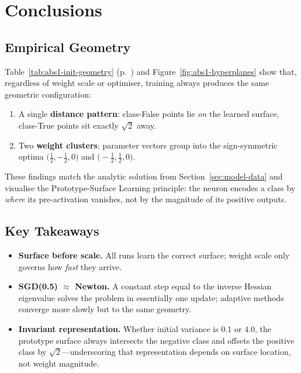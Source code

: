 ﻿%
\section{Conclusions}
\label{sec:abs1-conclusions}

\subsection*{Empirical Geometry}

Table~\ref{tab:abs1-init-geometry} (p.~\pageref{tab:abs1-init-geometry}) and
Figure~\ref{fig:abs1-hyperplanes} show that, regardless of weight scale or
optimiser, training always produces the same geometric configuration:

\begin{enumerate}[label=(\alph*)]
    \item A single \textbf{distance pattern}: class-False points lie \emph{on}
          the learned surface, class-True points sit exactly
          $\sqrt2$ away.
    \item Two \textbf{weight clusters}: parameter vectors group into the
          sign-symmetric optima
          \(\bigl(\tfrac12,-\tfrac12,0\bigr)\) and
          \(\bigl(-\tfrac12,\tfrac12,0\bigr)\).
\end{enumerate}

These findings match the analytic solution from
Section~\ref{sec:model-data} and visualise the Prototype-Surface Learning
principle: the neuron encodes a class by \emph{where} its pre-activation
vanishes, not by the magnitude of its positive outputs.

\subsection*{Key Takeaways}

\begin{itemize}
    \item \textbf{Surface before scale.}  
          All runs learn the correct surface; weight scale only governs how
          \emph{fast} they arrive.
    \item \textbf{SGD(0.5) $\boldsymbol{\approx}$ Newton.}  
          A constant step equal to the inverse Hessian eigenvalue solves the
          problem in essentially one update; adaptive methods converge more
          slowly but to the same geometry.
    \item \textbf{Invariant representation.}  
          Whether initial variance is $0.1$ or $4.0$, the prototype surface
          always intersects the negative class and offsets the positive class
          by $\sqrt2$—underscoring that representation depends on surface
          location, not weight magnitude.
\end{itemize}


